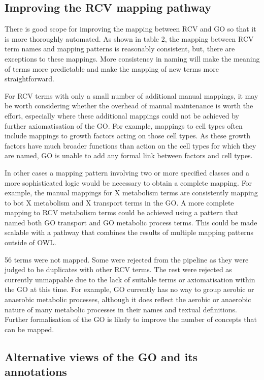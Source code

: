\documentclass[runningheads,a4paper]{llncs}
\begin{document}
{{\subsection{Improving the RCV mapping pathway}

There is good scope for improving the mapping between RCV and GO so that it is more thoroughly automated. As shown in table 2, the mapping between RCV term names and mapping patterns is reasonably consistent, but, there are exceptions to these mappings.  More consistency in naming will make the meaning of terms more predictable and make the mapping of new terms more straightforward. 

For RCV terms with only a small number of additional manual mappings, it may be worth considering whether the overhead of manual maintenance is worth the effort, especially where these additional mappings could not be achieved by further axiomatisation of the GO.  For example, mappings to cell types often include mappings to growth factors acting on those cell types.  As these growth factors have much broader functions than action on the cell types for which they are named, GO is unable to add any formal link between factors and cell types.

In other cases a mapping pattern involving two or more specified classes and a more sophisticated logic would be necessary to obtain a complete mapping.  For example, the manual mappings for X metabolism terms are consistently mapping to bot X metabolism and X transport terms in the GO. A more complete mapping to RCV metabolism terms could be achieved using a pattern that named both GO transport and GO metabolic process terms.  This could be made scalable with a pathway that combines the results of multiple mapping patterns outside of OWL.

56 terms were not mapped.  Some were rejected from the pipeline as they were judged to be duplicates with other RCV terms.  The rest were rejected as currently unmappable due to the lack of suitable terms or axiomatisation within the GO at this time.  For example, GO currently has no way to group aerobic or anaerobic metabolic processes, although it does reflect the aerobic or anaerobic nature of many metabolic processes in their names and textual definitions. Further formalisation of the GO is likely to improve the number of concepts that can be mapped.

\subsection{Alternative views of the GO and its annotations}

}}
\end{document}
